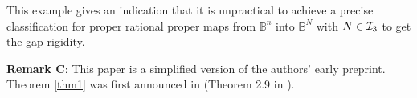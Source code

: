 \documentclass[12pt]{article}
\numberwithin{equation}{section}
\def\BB{{\mathbb B}}
\begin{document}
\medskip
This example gives an indication that it is  unpractical  to achieve
a precise classification for  proper rational proper  maps from
${\BB}^n$ into ${\BB}^N$ with $N\in {\cal I}_3$ to get the gap
rigidity.

\bigskip
{\bf Remark C}: This paper is a  simplified  version of the authors'
early   preprint. Theorem \ref{thm1}   was first announced in \cite{HJY}
(Theorem 2.9 in \cite{HJY}).


\end{document}
